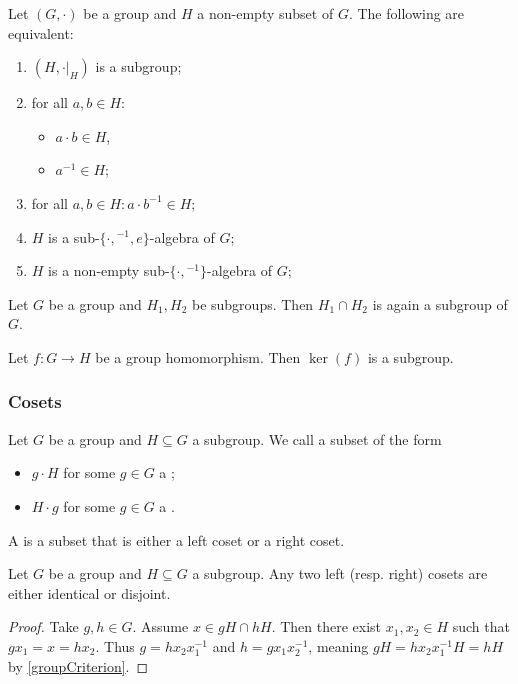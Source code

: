 \begin{lemma} \label{subgroupCriterion}
Let $(G,\boldsymbol{\cdot})$ be a group and $H$ a non-empty subset of $G$. The following are equivalent:
\begin{enumerate}
\item $(H,\boldsymbol{\cdot}|_H)$ is a subgroup;
\item for all $a,b\in H$:
\begin{itemize}
\item $a\cdot b \in H$,
\item $a^{-1}\in H$;
\end{itemize}
\item for all $a,b\in H: a\cdot b^{-1} \in H$;
\item $H$ is a sub-$\{\cdot, {}^{-1}, e\}$-algebra of $G$;
\item $H$ is a non-empty sub-$\{\cdot, {}^{-1}\}$-algebra of $G$;
\end{enumerate}
\end{lemma}

\begin{lemma}
Let $G$ be a group and $H_1, H_2$ be subgroups. Then $H_1\cap H_2$ is again a subgroup of $G$.
\end{lemma}
\begin{lemma}
Let $f:G\to H$ be a group homomorphism. Then $\ker(f)$ is a subgroup.
\end{lemma}

\subsubsection{Cosets}
\begin{definition}
Let $G$ be a group and $H\subseteq G$ a subgroup. We call a subset of the form
\begin{itemize}
\item $g\cdot H$ for some $g\in G$ a ;
\item $H\cdot g$ for some $g\in G$ a .
\end{itemize}
A  is a subset that is either a left coset or a right coset.
\end{definition}

\begin{lemma} \label{differentCosetsDisjoint}
Let $G$ be a group and $H\subseteq G$ a subgroup. Any two left (resp. right) cosets are either identical or disjoint.
\end{lemma}
\begin{proof}
Take $g,h\in G$. Assume $x\in gH\cap hH$. Then there exist $x_1,x_2\in H$ such that $gx_1 = x = hx_2$. Thus $g = hx_2x_1^{-1}$ and $h = gx_1x_2^{-1}$, meaning $gH = hx_2x_1^{-1}H = hH$ by \ref{groupCriterion}.
\end{proof}

